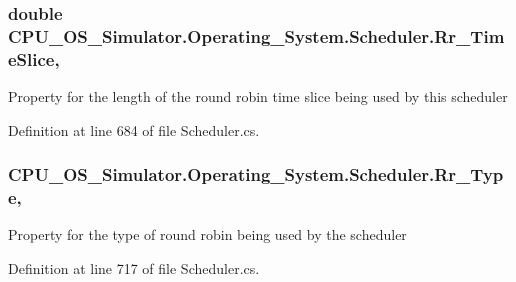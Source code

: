 \subsubsection[{Rr\+\_\+\+Time\+Slice}]{\setlength{\rightskip}{0pt plus 5cm}double C\+P\+U\+\_\+\+O\+S\+\_\+\+Simulator.\+Operating\+\_\+\+System.\+Scheduler.\+Rr\+\_\+\+Time\+Slice\hspace{0.3cm}{\ttfamily [get]}, {\ttfamily [set]}}\label{class_c_p_u___o_s___simulator_1_1_operating___system_1_1_scheduler_ab21e8ffe8d0f06388cc2310d3dbb3b48}


Property for the length of the round robin time slice being used by this scheduler 



Definition at line 684 of file Scheduler.\+cs.

\hypertarget{class_c_p_u___o_s___simulator_1_1_operating___system_1_1_scheduler_acc7c4b6c0383e4cf1a65251335f44e6d}{}
\subsubsection[{Rr\+\_\+\+Type}]{ C\+P\+U\+\_\+\+O\+S\+\_\+\+Simulator.\+Operating\+\_\+\+System.\+Scheduler.\+Rr\+\_\+\+Type\hspace{0.3cm}{\ttfamily [get]}, {\ttfamily [set]}}\label{class_c_p_u___o_s___simulator_1_1_operating___system_1_1_scheduler_acc7c4b6c0383e4cf1a65251335f44e6d}


Property for the type of round robin being used by the scheduler 



Definition at line 717 of file Scheduler.\+cs.

\hypertarget{class_c_p_u___o_s___simulator_1_1_operating___system_1_1_scheduler_a6de759cc7e75011ef51456dd95104a95}{}
